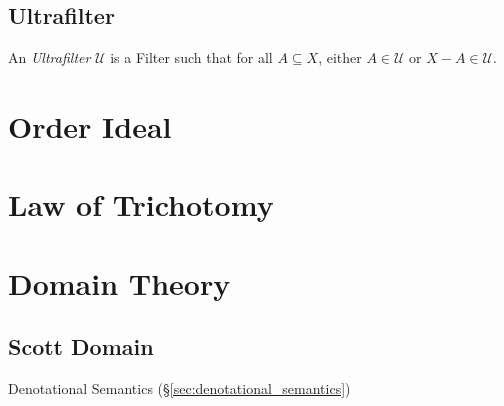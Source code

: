 \subsection{Ultrafilter}\label{sec:ultrafilter}

An \emph{Ultrafilter} $\mathcal{U}$ is a Filter such that for all $A
\subseteq X$, either $A \in \mathcal{U}$ or $X - A \in \mathcal{U}$.



\section{Order Ideal}\label{sec:order_ideal}

\section{Law of Trichotomy}\label{sec:trichotomy_law}



\section{Domain Theory}\label{sec:domain_theory}

\subsection{Scott Domain}\label{sec:scott_domain}

Denotational Semantics (\S\ref{sec:denotational_semantics})
